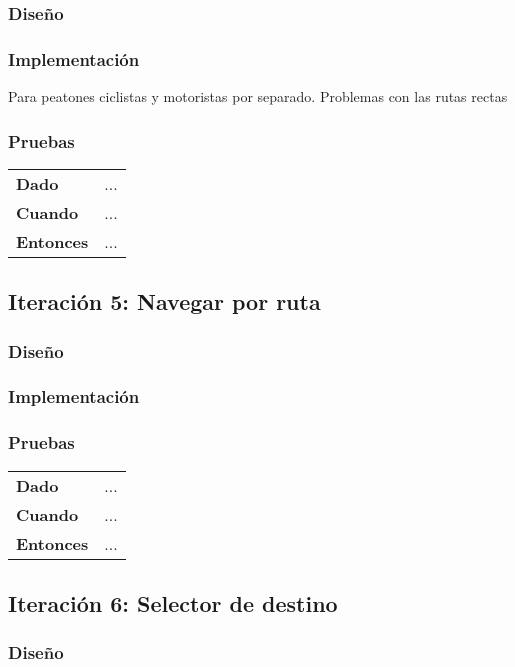 \subsubsection{Diseño}
\subsubsection{Implementación}
Para peatones ciclistas y motoristas por separado.
Problemas con las rutas rectas
\subsubsection{Pruebas}
\begin{tabular}{p{}p{}}
  \hline
  \textbf{Dado}     & ... \\
  \textbf{Cuando}   & ... \\
  \textbf{Entonces} & ... \\
  \hline
\end{tabular}

\subsection{Iteración 5: Navegar por ruta}
\subsubsection{Diseño}
\subsubsection{Implementación}
\subsubsection{Pruebas}
\begin{tabular}{p{}p{}}
  \hline
  \textbf{Dado}     & ... \\
  \textbf{Cuando}   & ... \\
  \textbf{Entonces} & ... \\
  \hline
\end{tabular}

\subsection{Iteración 6: Selector de destino}
\subsubsection{Diseño}

